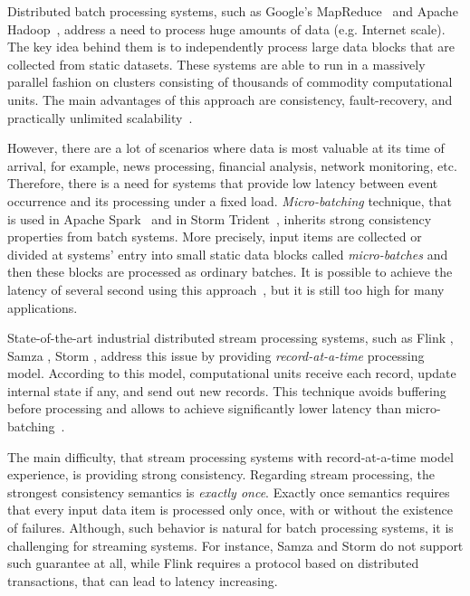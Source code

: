 
\label {fs-intro-seciton}

Distributed batch processing systems, such as Google's MapReduce~\cite{Dean:2008:MSD:1327452.1327492} and Apache Hadoop~\cite{hadoop2009hadoop}, address a need to process huge amounts of data (e.g. Internet scale). The key idea behind them is to independently process large data blocks that are collected from static datasets. These systems are able to run in a massively parallel fashion on clusters consisting of thousands of commodity computational units. The main advantages of this approach are consistency, fault-recovery, and practically unlimited scalability~\cite{borthakur2011apache}.

However, there are a lot of scenarios where data is most valuable at its time of arrival, for example, news processing, financial analysis, network monitoring, etc. Therefore, there is a need for systems that provide low latency between event occurrence and its processing under a fixed load. {\it Micro-batching} technique, that is used in Apache Spark~\cite{Zaharia:2012:DSE:2342763.2342773} and in Storm Trident~\cite{apache:storm:trident}, inherits strong consistency properties from batch systems. More precisely, input items are collected or divided at systems' entry into small static data blocks called {\it micro-batches} and then these blocks are processed as ordinary batches. It is possible to achieve the latency of several second using this approach~\cite{7530084, 7474816}, but it is still too high for many applications.

State-of-the-art industrial distributed stream processing systems, such as Flink \cite{carbone2015apache}, Samza \cite{Noghabi:2017:SSS:3137765.3137770}, Storm \cite{apache:storm}, address this issue by providing {\it record-at-a-time} processing model. According to this model, computational units receive each record, update internal state if any, and send out new records. This technique avoids buffering before processing and allows to achieve significantly lower latency than micro-batching~\cite{7530084}.

The main difficulty, that stream processing systems with record-at-a-time model experience, is providing strong consistency. Regarding stream processing, the strongest consistency semantics is {\it exactly once}. Exactly once semantics requires that every input data item is processed only once, with or without the existence of failures. Although, such behavior is natural for batch processing systems, it is challenging for streaming systems. For instance, Samza and Storm do not support such guarantee at all, while Flink requires a protocol based on distributed transactions, that can lead to latency increasing.

